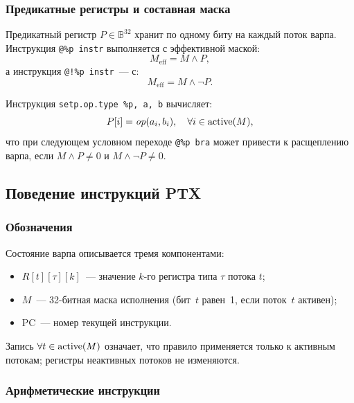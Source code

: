\subsubsection{Предикатные регистры и составная маска}

Предикатный регистр $P \in \mathbb{B}^{32}$ хранит по одному биту
на каждый поток варпа. Инструкция \texttt{@\%p instr} выполняется
с эффективной маской:
\begin{equation}
  M_{\mathrm{eff}} = M \mathbin{\wedge} P,
\end{equation}
а инструкция \texttt{@!\%p instr}~--- с:
\begin{equation}
  M_{\mathrm{eff}} = M \mathbin{\wedge} \neg P.
\end{equation}

Инструкция \texttt{setp.op.type \%p, a, b} вычисляет:
\begin{equation}
  P[i] = \mathit{op}(a_i, b_i), \quad \forall i \in \mathrm{active}(M),
\end{equation}
что при следующем условном переходе \texttt{@\%p bra} может привести
к расщеплению варпа, если $M \wedge P \neq 0$ и $M \wedge \neg P \neq 0$.

\subsection{Поведение инструкций PTX}

\subsubsection{Обозначения}

Состояние варпа описывается тремя компонентами:
\begin{itemize}
  \item $R[t][\tau][k]$~--- значение $k$-го регистра типа $\tau$ потока $t$;
  \item $M$~--- 32-битная маска исполнения (бит~$t$ равен~1, если поток~$t$ активен);
  \item $\mathrm{PC}$~--- номер текущей инструкции.
\end{itemize}

Запись $\forall t \in \mathrm{active}(M)$ означает, что правило применяется
только к активным потокам; регистры неактивных потоков не изменяются.

\subsubsection{Арифметические инструкции}

